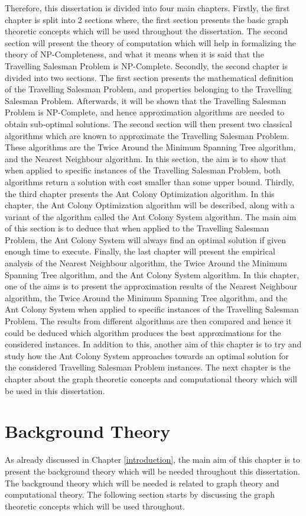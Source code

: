 \documentclass[12pt]{article}
\numberwithin{equation}{subsection}
\numberwithin{table}{subsection}
\numberwithin{algorithm}{subsection}
\numberwithin{figure}{subsection}
\begin{document}
Therefore, this dissertation is divided into four main chapters. Firstly, the first chapter is split into 2 sections where, the first section presents the basic graph theoretic concepts which will be used throughout the dissertation. The second section will present the theory of computation which will help in formalizing the theory of NP-Completeness, and what it means when it is said that the Travelling Salesman Problem is NP-Complete. Secondly, the second chapter is divided into two sections. The first section presents the mathematical definition of the Travelling Salesman Problem, and properties belonging to the Travelling Salesman Problem. Afterwards, it will be shown that the Travelling Salesman Problem is NP-Complete, and hence approximation algorithms are needed to obtain sub-optimal solutions. The second section will then present two classical algorithms which are known to approximate the Travelling Salesman Problem. These algorithms are the Twice Around the Minimum Spanning Tree algorithm, and the Nearest Neighbour algorithm. In this section, the aim is to show that when applied to specific instances of the Travelling Salesman Problem, both algorithms return a solution with cost smaller than some upper bound. Thirdly, the third chapter presents the Ant Colony Optimization algorithm. In this chapter, the Ant Colony Optimization algorithm will be described, along with a variant of the algorithm called the Ant Colony System algorithm. The main aim of this section is to deduce that when applied to the Travelling Salesman Problem, the Ant Colony System will always find an optimal solution if given enough time to execute. Finally, the last chapter will present the empirical analysis of the Nearest Neighbour algorithm, the Twice Around the Minimum Spanning Tree algorithm, and the Ant Colony System algorithm. In this chapter, one of the aims is to present the approximation results of the Nearest Neighbour algorithm, the Twice Around the Minimum Spanning Tree algorithm, and the Ant Colony System when applied to specific instances of the Travelling Salesman Problem. The results from different algorithms are then compared and hence it could be deduced which algorithm produces the best approximations for the considered instances. In addition to this, another aim of this chapter is to try and study how the Ant Colony System approaches towards an optimal solution for the considered Travelling Salesman Problem instances. The next chapter is the chapter about the graph theoretic concepts and computational theory which will be used in this dissertation.
\newpage
{\center\section{Background Theory}
\label{background_theory}}
As already discussed in Chapter \ref{introduction}, the main aim of this chapter is to present the background theory which will be needed throughout this dissertation. The background theory which will be needed is related to graph theory and computational theory. The following section starts by discussing the graph theoretic concepts which will be used throughout. 
\end{document}
